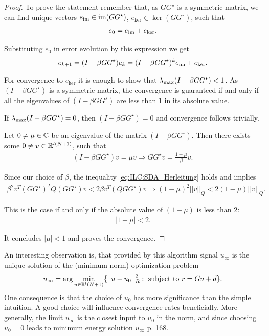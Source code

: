 \begin{proof}

To prove the statement remember that, as $GG^\star$ is a symmetric matrix, we can find unique vectors 
$e_{\operatorname{im}} \in \operatorname{im}(G G^\star)$, $e_{\ker} \in \ker(G G^\star)$, such that 
\begin{align}
e_0 = e_{\operatorname{im}} + e_{\ker}.
\end{align}


Substituting $e_0$ in error evolution by this expression we get  
\begin{align}
e_{k+1} = (I - \beta G G^\star) e_k = (I - \beta G G^\star)^k e_{\operatorname{im}} + e_{\ker}.
\end{align}

For convergence to $e_{\ker}$ it is enough  to show that $\lambda_{\mathrm{max}}(I - \beta G G^\star) < 1$. As $(I - \beta G G^\star)$ is a symmetric matrix, the convergence is guaranteed if and only if all the eigenvalues of $(I - \beta G G^\star)$ are less than 1 in its absolute value. 

If $\lambda_{\mathrm{max}}(I - \beta G G^\star) = 0$, then $(I - \beta G G^\star) = 0$  and convergence follows trivially. 

Let $0 \neq \mu \in {\mathbb{C}}$ be an eigenvalue of the matrix $(I - \beta G G^{\star})$. Then there exists some $0 \neq v \in {\mathbb{R}}^{l (N+1)}$, such that 
\begin{align}
	(I -\beta G G^{\star})v = \mu v \Rightarrow G G^{\star} v = \frac{1 - \mu}{\beta}v. 
\end{align}

Since our choice of $\beta$, the inequality \eqref{eq:ILC:SDA_Herleitung} holds and implies 
\begin{align}
\beta^2 v^T (G G^\star)^T Q (G G^\star) v < 2\beta v^T(Q G G^\star)v 
\Rightarrow (1 - \mu)^2 ||v||_Q < 2 (1 - \mu) ||v||_Q. 
\end{align}

This is the case if and only if the absolute value of $(1 - \mu)$ is less than 2: 
\begin{align}
|1 - \mu| < 2. 
\end{align}

It concludes $|\mu|<1$ and proves the convergence. 
\end{proof}



An interesting observation is, that provided by this algorithm signal $u_\infty$ is the unique solution of the (minimum norm) optimization problem 
\begin{align}
u_\infty = \arg \min_{u \in {\mathbb{R}}^l(N+1)} \{|| u - u_0||_R^2: \text{ subject to } r = Gu + d\}.
\end{align}
One consequence is that the choice of $u_0$ has more significance than the simple intuition. A good choice will influence convergence rates beneficially. More generally, the limit $u_\infty$ is the closest input to $u_0$ in the norm, and since choosing $u_0 = 0$ leads to minimum energy solution $u_\infty$ \cite{ILC} p. 168. 

